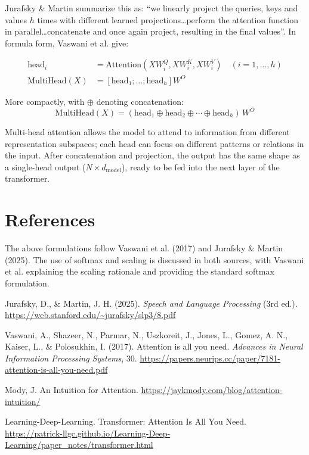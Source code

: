 \documentclass[11pt,a4paper]{article}
\begin{document}
Jurafsky \& Martin summarize this as: ``we linearly project the queries, keys and values $h$ times with different learned projections\ldots perform the attention function in parallel\ldots concatenate and once again project, resulting in the final values''. In formula form, Vaswani et al. give:

\begin{align}
\text{head}_i &= \text{Attention}(XW_i^Q, XW_i^K, XW_i^V) \quad (i= 1, \ldots, h)\\
\text{MultiHead}(X) &= [\text{head}_1; \ldots; \text{head}_h] W^O
\end{align}

More compactly, with $\oplus$ denoting concatenation:
$$\boxed{\text{MultiHead}(X) = (\text{head}_1 \oplus \text{head}_2 \oplus \cdots \oplus \text{head}_h)\,W^O}$$

Multi-head attention allows the model to attend to information from different representation subspaces; each head can focus on different patterns or relations in the input. After concatenation and projection, the output has the same shape as a single-head output ($N\times d_{\text{model}}$), ready to be fed into the next layer of the transformer.

\section{References}

The above formulations follow Vaswani et al. (2017) and Jurafsky \& Martin (2025). The use of softmax and scaling is discussed in both sources, with Vaswani et al. explaining the scaling rationale and providing the standard softmax formulation.

\begin{enumerate}[label={[\arabic*]}]
\item Jurafsky, D., \& Martin, J. H. (2025). \textit{Speech and Language Processing} (3rd ed.). \url{https://web.stanford.edu/~jurafsky/slp3/8.pdf}

\item Vaswani, A., Shazeer, N., Parmar, N., Uszkoreit, J., Jones, L., Gomez, A. N., Kaiser, L., \& Polosukhin, I. (2017). Attention is all you need. \textit{Advances in Neural Information Processing Systems}, 30. \url{https://papers.neurips.cc/paper/7181-attention-is-all-you-need.pdf}

\item Mody, J. An Intuition for Attention. \url{https://jaykmody.com/blog/attention-intuition/}

\item Learning-Deep-Learning. Transformer: Attention Is All You Need. \url{https://patrick-llgc.github.io/Learning-Deep-Learning/paper_notes/transformer.html}
\end{enumerate}
\end{document}
